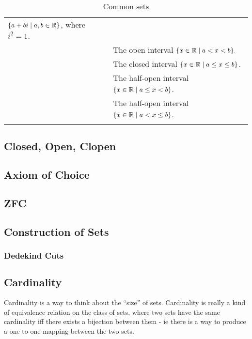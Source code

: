 \begin{longtable}{M p{0.7\textwidth}}
               \(\{a + bi \mid a, b \in \mathbb R\}\),
               where \(i^2 = 1\).\\
 & The open interval
                 \(\{x \in \mathbb R \mid a < x < b\}.\)\\
 & The closed interval
                 \(\{x \in \mathbb R \mid a \le x \le b\}\).\\
 & The half-open interval
                 \(\{x \in \mathbb R \mid a \le x < b\}\).\\
 & The half-open interval
                 \(\{x \in \mathbb R \mid a < x \le b\}\).\\
\bottomrule
\caption{Common sets}
\end{longtable}

\subsection{Closed, Open, Clopen}

\subsection{Axiom of Choice}

\subsection{ZFC}

\subsection{Construction of Sets}

\subsubsection{Dedekind Cuts} \label{sec_dedekind_cut}

\subsection{Cardinality}


Cardinality is a way to think about the ``size'' of sets. Cardinality is
really a kind of equivalence relation on the class of sets, where two sets
have the same cardinality iff there exists a bijection between them - ie
there is a way to produce a one-to-one mapping between the two sets.

